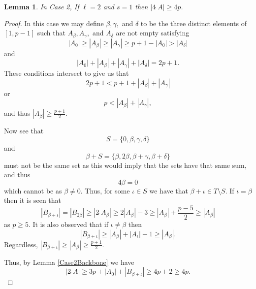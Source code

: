 \documentclass[a4paper, 12pt]{article}\usepackage[english]{babel}
\newtheorem{lem}[thm]{Lemma}
\newcommand{\<}{\langle}
\begin{document}
\begin{lem}\label{Case2:L2S1}
    In Case 2, If $\ell=2$ and $s=1$ then $|4\hat{\;}A|\geq 4p$.
\end{lem}
\begin{proof}
     In this case we may define $\beta,\gamma,$ and $\delta$ to be the three distinct elements of $[1,p-1]$ such that $A_\beta,A_\gamma,$ and $A_\delta$ are not empty satisfying \[|A_0|\geq |A_\beta|\geq |A_\gamma|\geq p+1-|A_0|>|A_\delta|\]
    and \[|A_0|+|A_\beta|+|A_\gamma|+|A_\delta|=2p+1.\]
    These conditions intersect to give us that \[2p+1<p+1+|A_\beta|+|A_\gamma|\] or \[p<|A_\beta|+|A_\gamma|,\] and thus $|A_\beta|\geq \frac{p+1}{2}$.

    Now see that \[S=\{0,\beta,\gamma,\delta\}\] and \[\beta+S=\{\beta,2\beta,\beta+\gamma,\beta+\delta\}\] must not be the same set as this would imply that the sets have that same sum, and thus \[4\beta=0\] which cannot be as $\beta\neq 0$. Thus, for some $\iota\in S$ we have that $\beta+\iota\in T\setminus S$. If $\iota=\beta$ then it is seen that \[|B_{\beta+\iota}|=|B_{2\beta}|\geq|2\hat{\;}A_\beta|\geq2|A_\beta|-3\geq |A_\beta| +\frac{p-5}{2}\geq  |A_\beta|\] as $p\geq 5$. It is also observed that if $\iota\neq \beta$ then \[|B_{\beta+\iota}|\geq |A_\beta|+|A_\iota|-1\geq |A_\beta|.\] Regardless, $|B_{\beta+\iota}|\geq |A_\beta|\geq \frac{p+1}{2}$.
    
    Thus, by Lemma \ref{Case2Backbone} we have  \[|2\hat{\;}A|\geq 3p+|A_0|+|B_{\beta+\iota}|\geq 4p+2\geq 4p.\] 
\end{proof}
\end{document}
